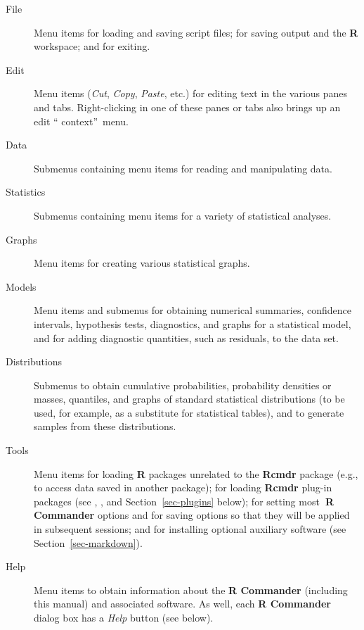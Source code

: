 \documentclass{article}%
\begin{document}
\begin{description}
\item[File] Menu items for loading and saving script files; for saving output
and the \textbf{R} workspace; and for exiting.

\item[Edit] Menu items (\emph{Cut}, \emph{Copy}, \emph{Paste}, etc.) for
editing text in the various panes and tabs. Right-clicking in one of these
panes or tabs also brings up an edit \textquotedblleft
context\textquotedblright\ menu.

\item[Data] Submenus containing menu items for reading and manipulating data.

\item[Statistics] Submenus containing menu items for a variety of statistical analyses.

\item[Graphs] Menu items for creating various statistical graphs.

\item[Models] Menu items and submenus for obtaining numerical summaries,
confidence intervals, hypothesis tests, diagnostics, and graphs for a
statistical model, and for adding diagnostic quantities, such as residuals, to
the data set.

\item[Distributions] Submenus to obtain cumulative probabilities, probability
densities or masses, quantiles, and graphs of standard statistical
distributions (to be used, for example, as a substitute for statistical
tables), and to generate samples from these distributions.

\item[Tools] Menu items for loading \textbf{R} packages unrelated to the
\textbf{Rcmdr} package (e.g., to access data saved in another package); for
loading \textbf{Rcmdr} plug-in packages (see \citealp{Fox07}, \citealp{FoxCarvalho12},
and Section~\ref{sec-plugins} below);
for setting most\textbf{\ R Commander} options and for
saving options so that they will be applied in subsequent sessions; and for
installing optional auxiliary software (see Section~\ref{sec-markdown}).

\item[Help] Menu items to obtain information about the \textbf{R Commander}
(including this manual) and associated software. As well, each \textbf{R
Commander} dialog box has a \emph{Help} button (see below).
\end{description}
\end{document}
